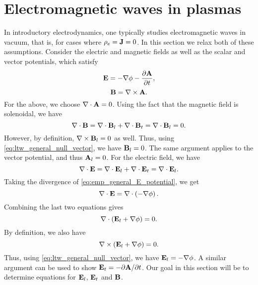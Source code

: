 \documentclass[a4paper,11pt]{report}
\begin{document}
\chapter{Electromagnetic waves in plasmas}
\label{sec:electromagnetic_waves_plasmas}
In introductory electrodynamics, one typically studies electromagnetic waves in vacuum, that is, for cases where $\rho_e = \mathbf{J} = 0$. In this section we relax both of these assumptions. Consider the electric and magnetic fields as well as the scalar and vector potentials, which satisfy
\begin{equation}
    \label{eq:emp_general_E_potential}
    \mathbf{E} = -\nabla \phi - \frac{\partial \mathbf{A}}{\partial t},
\end{equation}
\begin{equation}
    \label{eq:emp_general_B_potential}
    \mathbf{B} = \nabla \times \mathbf{A}.
\end{equation}
For the above, we choose $\nabla \cdot \mathbf{A} = 0$. Using the fact that the magnetic field is solenoidal, we have
\begin{equation*}
    \nabla \cdot \mathbf{B} = \nabla \cdot \mathbf{B}_l + \nabla \cdot \mathbf{B}_t = \nabla \cdot \mathbf{B}_l = 0.
\end{equation*}
However, by definition, $\nabla \times \mathbf{B}_l = 0$ as well. Thus, using \cref{eq:ltw_general_null_vector}, we have $\mathbf{B}_l = 0$. The same argument applies to the vector potential, and thus $\mathbf{A}_l = 0$. For the electric field, we have
\begin{equation*}
    \nabla \cdot \mathbf{E} = \nabla \cdot \mathbf{E}_l + \nabla \cdot \mathbf{E}_t = \nabla \cdot \mathbf{E}_l .
\end{equation*}
Taking the divergence of \cref{eq:emp_general_E_potential}, we get
\begin{equation}
    \nabla \cdot \mathbf{E} = \nabla \cdot \left ( -\nabla \phi \right ).
\end{equation}
Combining the last two equations gives
\begin{equation*}
    \nabla \cdot \left ( \mathbf{E}_l + \nabla \phi \right ) = 0.
\end{equation*}
By definition, we also have
\begin{equation*}
    \nabla \times \left ( \mathbf{E}_l + \nabla \phi \right ) = 0.
\end{equation*}
Thus, using \cref{eq:ltw_general_null_vector}, we have $\mathbf{E}_l = -\nabla \phi$. A similar argument can be used to show $\mathbf{E}_t = -\partial \mathbf{A} / \partial t$. Our goal in this section will be to determine equations for $\mathbf{E}_l$, $\mathbf{E}_t$ and $\mathbf{B}$.
\end{document}
